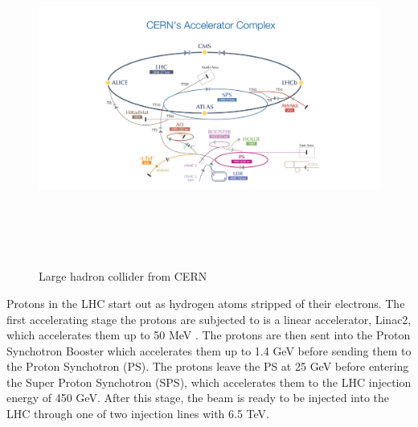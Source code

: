 \pagebreak

\begin{figure}[!htbp]
\centering
\includegraphics[width=17cm,height=11cm]{Chapter1/cern.jpg}
\caption{Large hadron collider from CERN\cite{cern1}} \label{lhc}
\end{figure}


Protons in the LHC start out as hydrogen atoms stripped of their electrons. The first accelerating stage the protons are subjected to is a linear accelerator, Linac2,
which accelerates them up to 50 MeV . The protons are then sent into the
Proton Synchotron Booster which accelerates them up to 1.4 GeV before sending them to the Proton Synchotron (PS). The protons leave the PS at 25 GeV before entering the Super Proton Synchotron (SPS), which accelerates them to the LHC injection energy of 450 GeV. After this stage, the beam is ready to be injected into
the LHC through one of two injection lines with 6.5 TeV.\cite{cern3}

